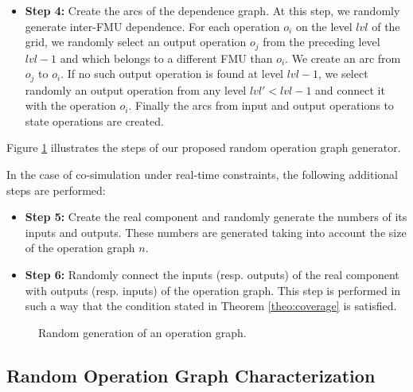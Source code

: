 \begin{itemize}
\begin{enumerate}
\end{enumerate}
\item \textbf{Step 4:} Create the arcs of the dependence graph. At this step, we randomly generate inter-FMU dependence. For each operation $o_i$ on the level $lvl$ of the grid, we randomly select an output operation $o_j$ from the preceding level $lvl-1$ and which belongs to a different FMU than $o_i$. We create an arc from $o_j$ to $o_i$. If no such output operation is found at level $lvl-1$, we select randomly an output operation from any level $lvl' < lvl-1$ and connect it with the operation $o_i$. Finally the arcs from input and output operations to state operations are created. 
\end{itemize}

Figure \ref{fig:genexample} illustrates the steps of our proposed random operation graph generator.

In the case of co-simulation under real-time constraints, the following additional steps are performed:

\begin{itemize}
\item \textbf{Step 5:} Create the real component and randomly generate the numbers of its inputs and outputs. These numbers are generated taking into account the size of the operation graph $n$.

\item \textbf{Step 6:} Randomly connect the inputs (resp. outputs) of the real component with outputs (resp. inputs) of the operation graph. This step is performed in such a way that the condition stated in Theorem \ref{theo:coverage} is satisfied. 

\end{itemize}

\begin{figure}[phbt]
\centering

\caption{Random generation of an operation graph.}
\label{fig:genexample}
\end{figure} 

\subsection{Random Operation Graph Characterization}


